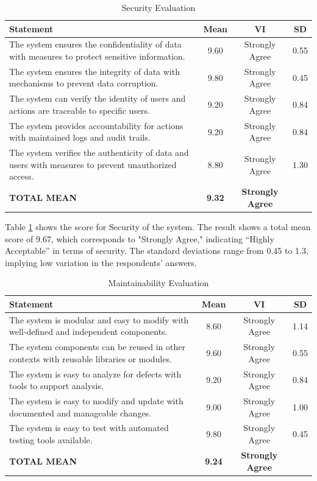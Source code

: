 \begin{table}[ht]
	\centering
	\caption{Security Evaluation}
	\label{secrty}
	\renewcommand{\arraystretch}{1.2}
	\begin{tabularx}{\linewidth}{|X|c|c|c|}
		\hline
		\textbf{Statement} & \textbf{Mean} & \textbf{VI} & \textbf{SD} \\ \hline
		The system ensures the confidentiality of data with measures to protect sensitive information.
		& 9.60 & Strongly Agree & 0.55 \\ \hline
		The system ensures the integrity of data with mechanisms to prevent data corruption.
		& 9.80 & Strongly Agree & 0.45 \\ \hline
		The system can verify the identity of users and actions are traceable to specific users.
		& 9.20 & Strongly Agree & 0.84 \\ \hline
		The system provides accountability for actions with maintained logs and audit trails.
		& 9.20 & Strongly Agree & 0.84 \\ \hline
		The system verifies the authenticity of data and users with measures to prevent unauthorized access.
		& 8.80 & Strongly Agree & 1.30 \\ \hline
		\textbf{TOTAL MEAN} & \textbf{9.32} & \textbf{Strongly Agree} & \\ \hline
	\end{tabularx}
\end{table}

Table \ref{secrty} shows the score for Security of the system. The result shows a total mean score of 9.67, which corresponds to "Strongly Agree," indicating “Highly Acceptable” in terms of security. The standard deviations range from 0.45 to 1.3, implying low variation in the respondents’ answers.

\begin{table}[ht]
	\centering
	\caption{Maintainability Evaluation}
	\label{mntnblty}
	\renewcommand{\arraystretch}{1.2}
	\begin{tabularx}{\linewidth}{|X|c|c|c|}
		\hline
		\textbf{Statement} & \textbf{Mean} & \textbf{VI} & \textbf{SD} \\ \hline
		The system is modular and easy to modify with well-defined and independent components.
		& 8.60 & Strongly Agree & 1.14 \\ \hline
		The system components can be reused in other contexts with reusable libraries or modules.
		& 9.60 & Strongly Agree & 0.55 \\ \hline
		The system is easy to analyze for defects with tools to support analysis.
		& 9.20 & Strongly Agree & 0.84 \\ \hline
		The system is easy to modify and update with documented and manageable changes.
		& 9.00 & Strongly Agree & 1.00 \\ \hline
		The system is easy to test with automated testing tools available.
		& 9.80 & Strongly Agree & 0.45 \\ \hline
		\textbf{TOTAL MEAN} & \textbf{9.24} & \textbf{Strongly Agree} & \\ \hline
	\end{tabularx}
\end{table}

